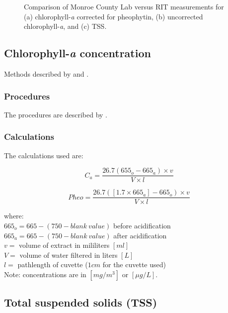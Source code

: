\begin{appendices}
\begin{figure}[htb!]
  \caption{Comparison of Monroe County Lab versus RIT measurements for (a) chlorophyll-{\it a} corrected for pheophytin, (b) uncorrected chlorophyll-{\it a}, and (c) TSS. \label{fig:RIT_County_Comp} } 
\end{figure}

\subsection{Chlorophyll-{\it a} concentration}

Methods described by \cite{Lorenzen:1967fk} and \cite{Ritchie:2008eu}.
\subsubsection{Procedures}
The procedures are described by \cite{Tyler2013_chl_protocol}.

\subsubsection{Calculations}

The calculations used \cite{Lorenzen:1967fk} are:

\begin{equation}
  C_a = \frac{26.7(655_o - 665_a)\times v}{V\times l}
\end{equation}

\begin{equation}
  Pheo = \frac{26.7([1.7\times 665_a]-665_o)\times v}{V\times l}
\end{equation}

\noindent where: \\
$665_o = 665 - (750-blank~value)$ before acidification\\
$665_a = 665 - (750-blank~value)$ after acidification  \\
$v = $ volume of extract in mililiters $[ml]$ \\
$V = $ volume of water filtered in liters $[L]$ \\
$l = $ pathlength of cuvette ($1cm$ for the cuvette used) \\

Note: concentrations are in $[mg/m^3]$ or $[\mu g/L]$.


\subsection{Total suspended solids (TSS)}


\end{appendices}
